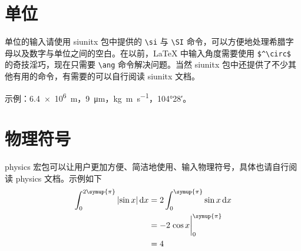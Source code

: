 \section{单位}
单位的输入请使用 siunitx 包中提供的 \verb|\si| 与 \verb|\SI| 命令，可以方便地处理希腊字母以及数字与单位之间的空白。在以前，\LaTeX{} 中输入角度需要使用 \verb|$^\circ$| 的奇技淫巧，现在只需要 \verb|\ang| 命令解决问题。当然 siunitx 包中还提供了不少其他有用的命令，有需要的可以自行阅读 siunitx 文档。

示例：\SI{6.4e6}{m}，\SI{9}{\micro\meter}，\si{kg.m.s^{-1}}，\ang{104;28;}。

\section{物理符号}
physics 宏包可以让用户更加方便、简洁地使用、输入物理符号，具体也请自行阅读 physics 文档。示例如下
\begin{equation}
  \begin{aligned}
    \int_0^{2\symup{\pi}} \abs{\sin{x}} \dd{x} & = 2 \int_0^{\symup{\pi}} \sin{x} \dd{x} \\
                                                      & = -2 \eval{\cos{x}}_0^{\symup{\pi}}     \\
                                                      & = 4
  \end{aligned}
\end{equation}

